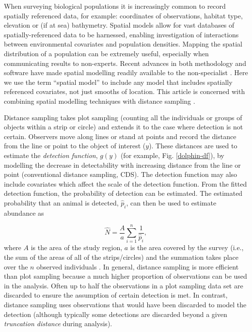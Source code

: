 \documentclass[a4paper,12pt]{article}
\begin{document}
When surveying biological populations it is increasingly common to record spatially referenced data, for example: coordinates of observations, habitat type, elevation or (if at sea) bathymetry. Spatial models allow for vast databases of spatially-referenced data \citep[e.g. OBIS-SEAMAP,][]{Halpin:2009je} to be harnessed, enabling investigation of interactions between environmental covariates and population densities. Mapping the spatial distribution of a population can be extremely useful, especially when communicating results to non-experts. Recent advances in both methodology and software have made spatial modelling readily available to the non-specialist \citep[e.g.,][]{Wood:2006wz, Rue:2009tw}. Here we use the term ``spatial model'' to include any model that includes spatially referenced covariates, not just smooths of location. This article is concerned with combining spatial modelling techniques with distance sampling \citep{Buckland:2001vm, Buckland:2004ts}. 

Distance sampling takes plot sampling (counting all the individuals or groups of objects within a strip or circle) and extends it to the case where detection is not certain. Observers move along lines or stand at points and record the distance from the  line or point to the object of interest ($y$). These distances are used to estimate the \textit{detection function}, $g(y)$ (for example, Fig. \ref{dolphin-df}), by modelling the decrease in detectability with increasing distance from the line or point (conventional distance sampling, CDS). The detection function may also include covariates \citep[multiple covariate distance sampling, MCDS;][]{Marques:2007vm} which affect the scale of the detection function. From the fitted detection function, the probability of detection can be estimated. The estimated probability that an animal is detected, $\hat{p}_i$, can then be used to estimate abundance as

\begin{equation}
\hat{N} = \frac{A}{a} \sum_{i=1}^{n} \frac{1}{\hat{p}_i},
\label{ht-est}
\end{equation}
where $A$ is the area of the study region, $a$ is the area covered by the survey (i.e., the sum of the areas of all of the strips/circles) and the summation takes place over the $n$ observed individuals \citep[Chapter 3]{Buckland:2001vm}. In general, distance sampling is more efficient than plot sampling because a much higher proportion of observations can be used in the analysis. Often up to half the observations in a plot sampling data set are discarded to ensure the assumption of certain detection is met. In contrast, distance sampling uses observations that would have been discarded to model the detection (although typically some detections are discarded beyond a given \textit{truncation distance} during analysis).
\end{document}
